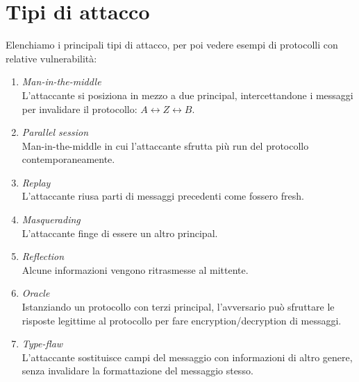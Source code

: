\documentclass[a4paper, 11pt, notitlepage, fleqn]{report}
\begin{document}
\section{Tipi di attacco}
Elenchiamo i principali tipi di attacco, per poi vedere esempi di protocolli con relative vulnerabilità:
\begin{enumerate}
	\item \emph{Man-in-the-middle}\\
	L'attaccante si posiziona in mezzo a due principal, intercettandone i messaggi per invalidare il protocollo: $A \leftrightarrow Z \leftrightarrow B$.
	\item \emph{Parallel session}\\
	Man-in-the-middle in cui l'attaccante sfrutta più run del protocollo contemporaneamente.
	\item \emph{Replay}\\
	L'attaccante riusa parti di messaggi precedenti come fossero fresh.
	\item \emph{Masquerading}\\
	L'attaccante finge di essere un altro principal.
	\item \emph{Reflection}\\
	Alcune informazioni vengono ritrasmesse al mittente.
	\item \emph{Oracle}\\
	Istanziando un protocollo con terzi principal, l'avversario può sfruttare le risposte legittime al protocollo per fare encryption/decryption di messaggi.
	\item \emph{Type-flaw}\\
	L'attaccante sostituisce campi del messaggio con informazioni di altro genere, senza invalidare la formattazione del messaggio stesso.
\end{enumerate}
\end{document}
